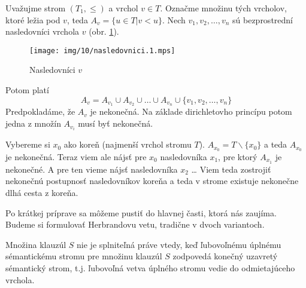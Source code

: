 \begin{dokaz} 
    Uvažujme strom $(T_1,\leq)$ a vrchol $v \in T$.
    Označme množinu tých vrcholov, ktoré ležia pod $v$, teda
    $A_v = \{ u \in T | v <u \}$.
    Nech $v_1, v_2, \dots, v_n$ sú bezprostrední nasledovníci vrchola $v$ (obr.
    \ref{fig:nasledovnici}). 
    \begin{figure}[h]
        \centering\texttt{[image: img/10/nasledovnici.1.mps]}
        \caption{Nasledovníci $v$}
        \label{fig:nasledovnici}
    \end{figure}
    Potom platí
    \begin{equation*}
        A_v = A_{v_1} \cup A_{v_2} \cup \ldots \cup A_{v_n}
        \cup \{v_1, v_2, \ldots, v_n\}
    \end{equation*}
    Predpokladáme, že $A_v$ je nekonečná.
    Na základe dirichletovho princípu potom jedna z množín $A_{v_i}$
    musí byť nekonečná.

    Vybereme si $x_0$ ako koreň (najmenší vrchol stromu $T$). 
    $A_{x_0} = T \backslash \{x_0\}$ a teda $A_{x_0}$ je nekonečná.
    Teraz viem ale nájsť pre $x_0$ nasledovníka $x_1$, pre ktorý
    $A_{x_1}$ je nekonečné. A pre ten vieme nájsť nasledovníka $x_2$
    \dots
    Viem teda zostrojiť nekonečnú postupnosť nasledovníkov koreňa a
    teda v strome existuje nekonečne dlhá cesta z koreňa.
\end{dokaz}

Po krátkej príprave sa môžeme pustiť do hlavnej časti, ktorá nás
zaujíma. Budeme si formulovať Herbrandovu vetu, tradične v dvoch
variantoch.

\begin{veta}[Herbrandova 1]
    Množina klauzúl $S$ nie je splniteľná práve vtedy,
    keď ľubovoľnému úplnému sémantickému stromu pre množinu klauzúl
    $S$ zodpovedá konečný uzavretý sémantický strom,
    t.j. ľubovoľná vetva úplného stromu vedie do odmietajúceho vrchola.
\end{veta}


